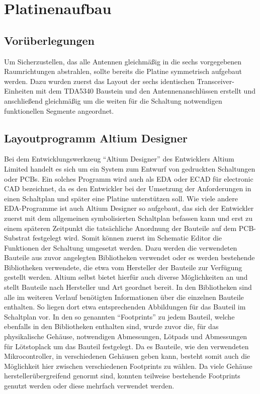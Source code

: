 \chapter{Platinenaufbau}
\label{sec:Platinenaufbau}
\pagestyle{scrheadings}

\section{Vorüberlegungen}
Um Sicherzustellen, das alle Antennen gleichmäßig in die sechs vorgegebenen Raumrichtungen abstrahlen, sollte bereits die Platine symmetrisch aufgebaut werden. Dazu wurden zuerst das Layout der sechs identischen Transceiver-Einheiten mit dem TDA5340 Baustein und den Antennenanschlüssen erstellt und anschließend gleichmäßig um die weiten für die Schaltung notwendigen funktionellen Segmente angeordnet.

 
\section{Layoutprogramm Altium Designer}
Bei dem Entwicklungswerkzeug \enquote{Altium Designer} des Entwicklers Altium Limited handelt es sich um ein System zum Entwurf von  gedruckten  Schaltungen oder \acp{PCB}. Ein solches Programm wird auch als \ac{EDA} oder ECAD für electronic \ac{CAD} bezeichnet, da es den Entwickler bei der Umsetzung der Anforderungen in einen Schaltplan und später eine Platine unterstützen soll.
Wie viele andere \ac{EDA}-Programme ist auch Altium Designer so aufgebaut, das sich der Entwickler zuerst mit dem allgemeinen symbolisierten Schaltplan befassen kann und erst zu einem späteren Zeitpunkt die tatsächliche Anordnung der Bauteile auf dem \ac{PCB}-Substrat festgelegt wird. Somit können zuerst im Schematic Editor die Funktionen der Schaltung umgesetzt werden. Dazu werden die verwendeten Bauteile aus zuvor angelegten Bibliotheken verwendet oder es werden bestehende Bibliotheken verwendete, die etwa vom Hersteller der Bauteile zur Verfügung gestellt werden. Altium selbst bietet hierfür auch diverse Möglichkeiten an und stellt Bauteile nach Hersteller und Art geordnet bereit.
In den Bibliotheken sind alle im weiteren Verlauf benötigten Informationen über die einzelnen Bauteile enthalten. So liegen dort etwa  entsprechenden Abbildungen für das Bauteil im  Schaltplan  vor. In den so genannten \enquote{Footprints} zu jedem Bauteil, welche ebenfalls in den Bibliotheken enthalten sind, wurde zuvor die, für das physikalische Gehäuse, notwendigen Abmessungen, Lötpads und Abmessungen für Lötstoplack um das Bauteil festgelegt. Da es Bauteile, wie den verwendeten  Mikrocontroller, in verschiedenen Gehäusen geben kann, besteht somit auch die Möglichkeit hier zwischen verschiedenen Footprints zu wählen. Da viele Gehäuse herstellerübergreifend genormt sind, konnten teilweise bestehende Footprints genutzt werden oder diese mehrfach verwendet werden.



